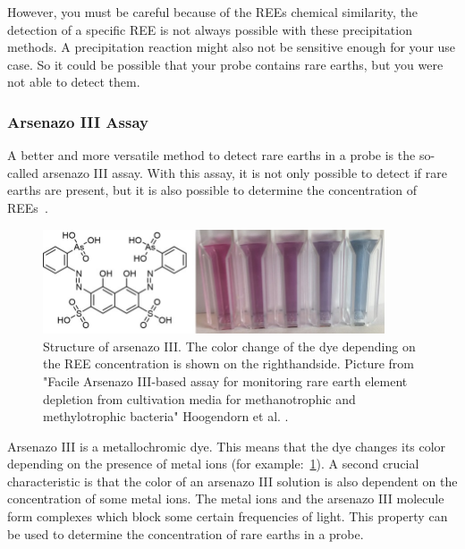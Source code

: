 However, you must be careful because of the REEs chemical similarity, the detection of a specific REE is not always possible with these precipitation methods.
A precipitation reaction might also not be sensitive enough for your use case.
So it could be possible that your probe contains rare earths, but you were not able to detect them.

\newpage

\subsubsection{Arsenazo III Assay}
A better and more versatile method to detect rare earths in a probe is the so-called arsenazo III assay.
With this assay, it is not only possible to detect if rare earths are present, but it is also possible to determine the concentration of REEs~\cite{arsenazo3assay}.

\begin{figure}[H]
    \centering
    \includegraphics[width=0.9\textwidth]{media/images/arsenazo3_structure_example}
    \caption{Structure of arsenazo III. The color change of the dye depending on the REE concentration is shown on the righthandside. Picture from "Facile Arsenazo III-based assay for monitoring rare earth element depletion from cultivation media for methanotrophic and methylotrophic bacteria" Hoogendorn et al. \cite{arsenazo3assay}.}
    \label{fig:arsenazo3}
\end{figure}

Arsenazo III is a metallochromic dye.
This means that the dye changes its color depending on the presence of metal ions (for example:~\ref{fig:arsenazo3}).
A second crucial characteristic is that the color of an arsenazo III solution is also dependent on the concentration of some metal ions.
The metal ions and the arsenazo III molecule form complexes which block some certain frequencies of light.
This property can be used to determine the concentration of rare earths in a probe.

\newpage